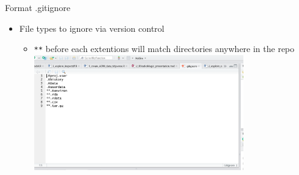 \documentclass[
  ignorenonframetext,
]{beamer}
\providecommand{\tightlist}{%
  \setlength{\itemsep}{0pt}\setlength{\parskip}{0pt}}
\begin{document}
\begin{frame}[fragile]{Format .gitignore}
\protect\hypertarget{format-.gitignore}{}

\begin{itemize}
\tightlist
\item
  File types to ignore via version control

  \begin{itemize}
  \tightlist
  \item
    \texttt{**} before each extentions will match directories anywhere
    in the repo
    \includegraphics[width=0.75\textwidth,height=\textheight]{../external/images/gitignore.PNG}
  \end{itemize}
\end{itemize}

\end{frame}
\end{document}
